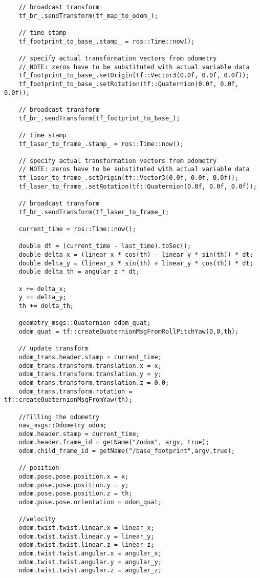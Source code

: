 \begin{lstlisting}
    // broadcast transform
    tf_br_.sendTransform(tf_map_to_odom_);

    // time stamp
    tf_footprint_to_base_.stamp_ = ros::Time::now();

    // specify actual transformation vectors from odometry
    // NOTE: zeros have to be substituted with actual variable data
    tf_footprint_to_base_.setOrigin(tf::Vector3(0.0f, 0.0f, 0.0f));
    tf_footprint_to_base_.setRotation(tf::Quaternion(0.0f, 0.0f, 0.0f));

    // broadcast transform
    tf_br_.sendTransform(tf_footprint_to_base_);

    // time stamp
    tf_laser_to_frame_.stamp_ = ros::Time::now();

    // specify actual transformation vectors from odometry
    // NOTE: zeros have to be substituted with actual variable data
    tf_laser_to_frame_.setOrigin(tf::Vector3(0.0f, 0.0f, 0.0f));
    tf_laser_to_frame_.setRotation(tf::Quaternion(0.0f, 0.0f, 0.0f));

    // broadcast transform
    tf_br_.sendTransform(tf_laser_to_frame_);

    current_time = ros::Time::now(); 

    double dt = (current_time - last_time).toSec();
    double delta_x = (linear_x * cos(th) - linear_y * sin(th)) * dt;
    double delta_y = (linear_x * sin(th) + linear_y * cos(th)) * dt;
    double delta_th = angular_z * dt;

    x += delta_x;
    y += delta_y;
    th += delta_th;

    geometry_msgs::Quaternion odom_quat;  
    odom_quat = tf::createQuaternionMsgFromRollPitchYaw(0,0,th);

    // update transform
    odom_trans.header.stamp = current_time; 
    odom_trans.transform.translation.x = x; 
    odom_trans.transform.translation.y = y; 
    odom_trans.transform.translation.z = 0.0;
    odom_trans.transform.rotation = tf::createQuaternionMsgFromYaw(th);

    //filling the odometry
    nav_msgs::Odometry odom;
    odom.header.stamp = current_time;
    odom.header.frame_id = getName("/odom", argv, true);
    odom.child_frame_id = getName("/base_footprint",argv,true);

    // position
    odom.pose.pose.position.x = x;
    odom.pose.pose.position.y = y;
    odom.pose.pose.position.z = th;
    odom.pose.pose.orientation = odom_quat;

    //velocity
    odom.twist.twist.linear.x = linear_x;
    odom.twist.twist.linear.y = linear_y;
    odom.twist.twist.linear.z = linear_z;
    odom.twist.twist.angular.x = angular_x;
    odom.twist.twist.angular.y = angular_y;
    odom.twist.twist.angular.z = angular_z;


\end{lstlisting}
